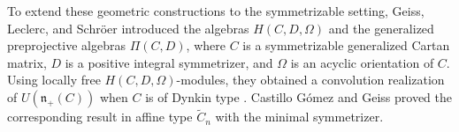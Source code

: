 \documentclass[12pt,reqno]{amsart}
\numberwithin{equation}{section}
\theoremstyle{definition}
\theoremstyle{remark}
\theoremstyle{plain}
\theoremstyle{plain}
\begin{document}



To extend these geometric constructions to the symmetrizable setting, Geiss, Leclerc, and Schr\"oer \cite{GLS17} introduced the algebras $H(C,D,\Omega)$ and the generalized preprojective algebras $\Pi(C,D)$, where $C$ is a symmetrizable generalized Cartan matrix, $D$ is a positive integral symmetrizer, and $\Omega$ is an acyclic orientation of $C$. Using locally free $H(C,D,\Omega)$-modules, they obtained a convolution realization of $U(\mathfrak n_+(C))$ when $C$ is of Dynkin type \cite{GLS16}. Castillo G\'omez and Geiss \cite{CG25} proved the corresponding result in affine type $\widetilde C_n$ with the minimal symmetrizer. 
\end{document}

